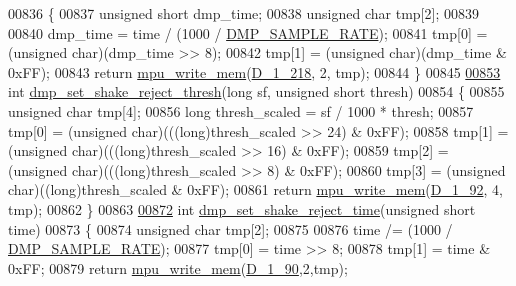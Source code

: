\begin{DoxyCode}
00836 \{
00837     \textcolor{keywordtype}{unsigned} \textcolor{keywordtype}{short} dmp\_time;
00838     \textcolor{keywordtype}{unsigned} \textcolor{keywordtype}{char} tmp[2];
00839 
00840     dmp\_time = time / (1000 / \hyperlink{group___d_r_i_v_e_r_s_ga9d0f0425cbcb58186500cb8686e41e67}{DMP\_SAMPLE\_RATE});
00841     tmp[0] = (\textcolor{keywordtype}{unsigned} char)(dmp\_time >> 8);
00842     tmp[1] = (\textcolor{keywordtype}{unsigned} char)(dmp\_time & 0xFF);
00843     \textcolor{keywordflow}{return} \hyperlink{group___d_r_i_v_e_r_s_gafea59910bc3dd30ba3356b1c75213a5f}{mpu\_write\_mem}(\hyperlink{group___d_r_i_v_e_r_s_ga0c4568c70e2cd501e8de6c3147eb0276}{D\_1\_218}, 2, tmp);
00844 \}
00845 
\hypertarget{inv__mpu__dmp__motion__driver_8c_source.tex_l00853}{}\hyperlink{group___d_r_i_v_e_r_s_ga62efdae1330d5bcaf4c75b069ded0ed0}{00853} \textcolor{keywordtype}{int} \hyperlink{group___d_r_i_v_e_r_s_ga62efdae1330d5bcaf4c75b069ded0ed0}{dmp\_set\_shake\_reject\_thresh}(\textcolor{keywordtype}{long} sf, \textcolor{keywordtype}{unsigned} \textcolor{keywordtype}{short} thresh)
00854 \{
00855     \textcolor{keywordtype}{unsigned} \textcolor{keywordtype}{char} tmp[4];
00856     \textcolor{keywordtype}{long} thresh\_scaled = sf / 1000 * thresh;
00857     tmp[0] = (\textcolor{keywordtype}{unsigned} char)(((\textcolor{keywordtype}{long})thresh\_scaled >> 24) & 0xFF);
00858     tmp[1] = (\textcolor{keywordtype}{unsigned} char)(((\textcolor{keywordtype}{long})thresh\_scaled >> 16) & 0xFF);
00859     tmp[2] = (\textcolor{keywordtype}{unsigned} char)(((\textcolor{keywordtype}{long})thresh\_scaled >> 8) & 0xFF);
00860     tmp[3] = (\textcolor{keywordtype}{unsigned} char)((\textcolor{keywordtype}{long})thresh\_scaled & 0xFF);
00861     \textcolor{keywordflow}{return} \hyperlink{group___d_r_i_v_e_r_s_gafea59910bc3dd30ba3356b1c75213a5f}{mpu\_write\_mem}(\hyperlink{group___d_r_i_v_e_r_s_gabd8a1ea9b71ac9389116a33e317aad6c}{D\_1\_92}, 4, tmp);
00862 \}
00863 
\hypertarget{inv__mpu__dmp__motion__driver_8c_source.tex_l00872}{}\hyperlink{group___d_r_i_v_e_r_s_ga09d7a6d90e1bd2e907f1866d850c5608}{00872} \textcolor{keywordtype}{int} \hyperlink{group___d_r_i_v_e_r_s_ga09d7a6d90e1bd2e907f1866d850c5608}{dmp\_set\_shake\_reject\_time}(\textcolor{keywordtype}{unsigned} \textcolor{keywordtype}{short} time)
00873 \{
00874     \textcolor{keywordtype}{unsigned} \textcolor{keywordtype}{char} tmp[2];
00875 
00876     time /= (1000 / \hyperlink{group___d_r_i_v_e_r_s_ga9d0f0425cbcb58186500cb8686e41e67}{DMP\_SAMPLE\_RATE});
00877     tmp[0] = time >> 8;
00878     tmp[1] = time & 0xFF;
00879     \textcolor{keywordflow}{return} \hyperlink{group___d_r_i_v_e_r_s_gafea59910bc3dd30ba3356b1c75213a5f}{mpu\_write\_mem}(\hyperlink{group___d_r_i_v_e_r_s_ga63bb29a8be69128a60f4716aacc447a8}{D\_1\_90},2,tmp);

\end{DoxyCode}
